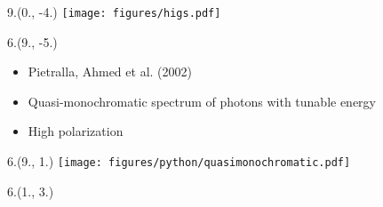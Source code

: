 



\begin{textblock}{9.}(0., -4.)
    \texttt{[image: figures/higs.pdf]}
\end{textblock}

\begin{textblock}{6.}(9., -5.)
    \begin{itemize}
        \item Pietralla, Ahmed et al. (2002)
        \item Quasi-monochromatic spectrum of photons with tunable energy
        \item High polarization
    \end{itemize}
\end{textblock}

\def \SPECTRUMX {9.}
\def \SPECTRUMY {1.}

\begin{textblock}{6.}(\SPECTRUMX, \SPECTRUMY)
    \texttt{[image: figures/python/quasimonochromatic.pdf]}
\end{textblock}

\begin{textblock}{6.}(1., 3.)
\end{textblock}